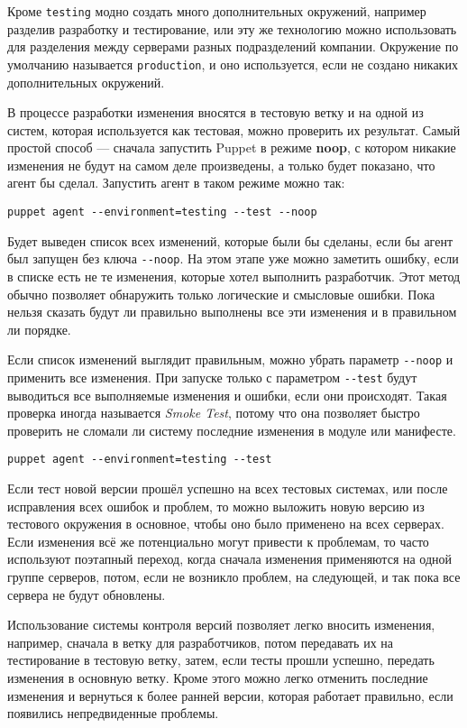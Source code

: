 Кроме \texttt{testing} модно создать много дополнительных окружений, например разделив разработку и тестирование, или эту же технологию можно использовать для разделения между серверами разных подразделений компании. Окружение по умолчанию называется \texttt{production}, и оно используется, если не создано никаких дополнительных окружений.

В процессе разработки изменения вносятся в тестовую ветку и на одной из систем, которая используется как тестовая, можно проверить их результат. Самый простой способ --- сначала запустить Puppet в режиме \textbf{noop}, с котором никакие изменения не будут на самом деле произведены, а только будет показано, что агент бы сделал. Запустить агент в таком режиме можно так:

\begin{verbatim}
puppet agent --environment=testing --test --noop
\end{verbatim}

Будет выведен список всех изменений, которые были бы сделаны, если бы агент был запущен без ключа \texttt{-{}-noop}. На этом этапе уже можно заметить ошибку, если в списке есть не те изменения, которые хотел выполнить разработчик. Этот метод обычно позволяет обнаружить только логические и смысловые ошибки. Пока нельзя сказать будут ли правильно выполнены все эти изменения и в правильном ли порядке.

Если список изменений выглядит правильным, можно убрать параметр \texttt{-{}-noop} и применить все изменения. При запуске только с параметром \texttt{-{}-test} будут выводиться все выполняемые изменения и ошибки, если они происходят. Такая проверка иногда называется \textit{Smoke Test}, потому что она позволяет быстро проверить не сломали ли систему последние изменения в модуле или манифесте.

\begin{verbatim}
puppet agent --environment=testing --test
\end{verbatim}

Если тест новой версии прошёл успешно на всех тестовых системах, или после исправления всех ошибок и проблем, то можно выложить новую версию из тестового окружения в основное, чтобы оно было применено на всех серверах. Если изменения всё же потенциально могут привести к проблемам, то часто используют поэтапный переход, когда сначала изменения применяются на одной группе серверов, потом, если не возникло проблем, на следующей, и так пока все сервера не будут обновлены.

Использование системы контроля версий позволяет легко вносить изменения, например, сначала в ветку для разработчиков, потом передавать их на тестирование в тестовую ветку, затем, если тесты прошли успешно, передать изменения в основную ветку. Кроме этого можно легко отменить последние изменения и вернуться к более ранней версии, которая работает правильно, если появились непредвиденные проблемы.

